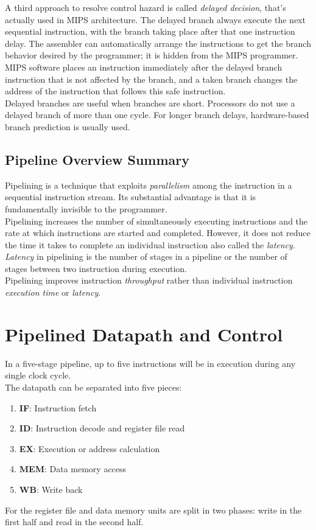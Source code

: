 \documentclass[12pt]{article}
\theoremstyle{definition}
\begin{document}
  A third approach to resolve control hazard is called \emph{delayed decision}, that's actually used in MIPS architecture.
  The delayed branch always execute the next sequential instruction, with the branch taking place after that one instruction delay.
  The assembler can automatically arrange the instructions to get the branch behavior desired by the programmer; it is hidden from the MIPS programmer.
  MIPS software places an instruction immediately after the delayed branch instruction that is not affected by the branch, and a taken branch changes the address of the instruction that follows this safe instruction. \\
  Delayed branches are useful when branches are short.
  Processors do not use a delayed branch of more than one cycle.
  For longer branch delays, hardware-based branch prediction is usually used.

  \subsection{Pipeline Overview Summary}
  Pipelining is a technique that exploits \emph{parallelism} among the instruction in a sequential instruction stream.
  Its substantial advantage is that it is fundamentally invisible to the programmer. \\
  Pipelining increases the number of simultaneously executing instructions and the rate at which instructions are started and completed.
  However, it does not reduce the time it takes to complete an individual instruction also called the \emph{latency}.
  \emph{Latency} in pipelining is the number of stages in a pipeline or the number of stages between two instruction during execution. \\
  Pipelining improves instruction \emph{throughput} rather than individual instruction \emph{execution time} or \emph{latency}.

  \section{Pipelined Datapath and Control}
  In a five-stage pipeline, up to five instructions will be in execution during any single clock cycle. \\
  The datapath can be separated into five pieces:
  \begin{enumerate}
    \item \textbf{IF}: Instruction fetch
    \item \textbf{ID}: Instruction decode and register file read
    \item \textbf{EX}: Execution or address calculation
    \item \textbf{MEM}: Data memory access
    \item \textbf{WB}: Write back
  \end{enumerate}
  For the register file and data memory units are split in two phases: write in the first half and read in the second half.
\end{document}
